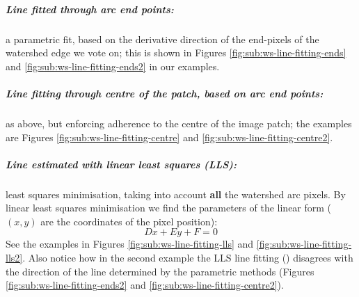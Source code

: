 \subparagraph{Line fitted through arc {\bf end points}:}
\label{par:ch4-line-ends}
a parametric fit, based on the derivative direction of the end-pixels of the watershed edge we vote on; this is shown in Figures \ref{fig:sub:ws-line-fitting-ends} and \ref{fig:sub:ws-line-fitting-ends2} in our examples.

\subparagraph{Line fitting through {\bf centre} of the patch, based on arc end points:} 
\label{par:ch4-line-centre}
as above, but enforcing adherence to the centre of the image patch; the examples are Figures  \ref{fig:sub:ws-line-fitting-centre} and \ref{fig:sub:ws-line-fitting-centre2}.

\subparagraph{Line estimated with {\bf linear least squares (LLS)}:} 
\label{par:ch4-line-fitting-lls}
least squares minimisation, taking into account \textbf{all} the watershed arc pixels. By linear least squares minimisation we find the parameters of the linear form ($(x,y)$ are the coordinates of the pixel position):
\[
 Dx+Ey+F=0
\]
See the examples in Figures \ref{fig:sub:ws-line-fitting-lls} and \ref{fig:sub:ws-line-fitting-lls2}. Also notice how in the second example  %
the LLS line fitting () disagrees with the direction of the line determined by the parametric methods (Figures \ref{fig:sub:ws-line-fitting-ends2} and \ref{fig:sub:ws-line-fitting-centre2}).


